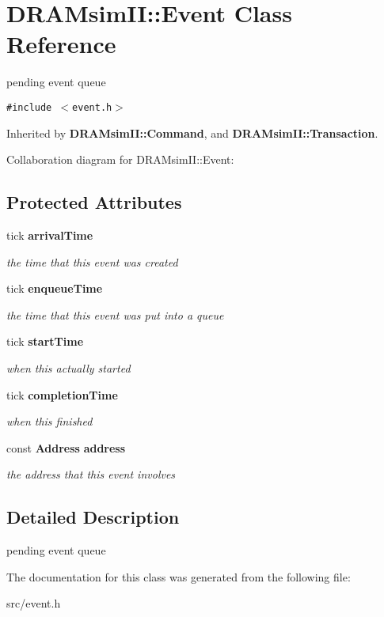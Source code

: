 \section{DRAMsimII::Event Class Reference}
\label{class_d_r_a_msim_i_i_1_1_event}
pending event queue  


{\tt \#include $<$event.h$>$}

Inherited by {\bf DRAMsimII::Command}, and {\bf DRAMsimII::Transaction}.

Collaboration diagram for DRAMsimII::Event:\subsection*{Protected Attributes}
\begin{CompactItemize}
\item 
tick {\bf arrivalTime}\label{class_d_r_a_msim_i_i_1_1_event_5eae270c205a02b2fb28d11ab84a6ed9}

\begin{CompactList}\small\item\em the time that this event was created \item\end{CompactList}\item 
tick {\bf enqueueTime}\label{class_d_r_a_msim_i_i_1_1_event_55cd17fa82ce4031824037df59dc50d3}

\begin{CompactList}\small\item\em the time that this event was put into a queue \item\end{CompactList}\item 
tick {\bf startTime}\label{class_d_r_a_msim_i_i_1_1_event_9f6b444813bf6568040678e0d8139d44}

\begin{CompactList}\small\item\em when this actually started \item\end{CompactList}\item 
tick {\bf completionTime}\label{class_d_r_a_msim_i_i_1_1_event_2a6e865d555bcde6264e8726edc95b38}

\begin{CompactList}\small\item\em when this finished \item\end{CompactList}\item 
const {\bf Address} {\bf address}\label{class_d_r_a_msim_i_i_1_1_event_6aa0830ccf3c9f103bc6dfaab1919562}

\begin{CompactList}\small\item\em the address that this event involves \item\end{CompactList}\end{CompactItemize}


\subsection{Detailed Description}
pending event queue 

The documentation for this class was generated from the following file:\begin{CompactItemize}
\item 
src/event.h\end{CompactItemize}
